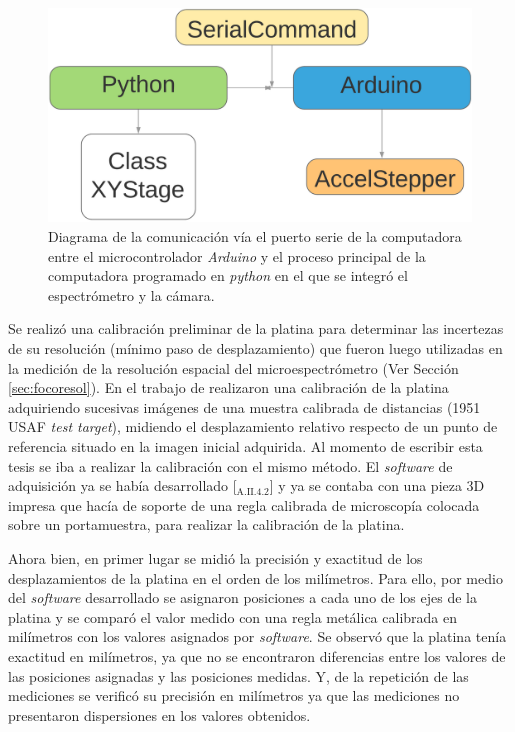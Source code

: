 \begin{figure}[H]
	\centering
	\includegraphics[scale=0.5]{Figs/microespectrometro/diagflujoplatina.png}
	\caption{Diagrama de la comunicación vía el puerto serie de la computadora entre el microcontrolador \textit{Arduino} y el proceso principal de la computadora programado en \textit{python} en el que se integró el espectrómetro y la cámara.}
	\label{fig:cnpl}
\end{figure}

Se realizó una calibración preliminar de la platina para determinar las incertezas de su resolución (mínimo paso de desplazamiento) que fueron luego utilizadas en la medición de la resolución espacial del microespectrómetro (Ver Sección \ref{sec:focoresol}). En el trabajo de \cite{schaa} realizaron una calibración de la platina adquiriendo sucesivas imágenes de una muestra calibrada de distancias (1951 USAF \textit{test target}), midiendo el desplazamiento relativo respecto de un punto de referencia situado en la imagen inicial adquirida. Al momento de escribir esta tesis se iba a realizar la calibración con el mismo método. El \textit{software} de adquisición ya se había desarrollado [\href{https://github.com/jrr1984/defectsGUI/blob/master/views.py}{\faGithub$_{\text{A.II}.4.2}$}] y ya se contaba con una pieza 3D impresa que hacía de soporte de una regla calibrada de microscopía colocada sobre un portamuestra, para realizar la calibración de la platina.

Ahora bien, en primer lugar se midió la precisión y exactitud de los desplazamientos de la platina en el orden de los milímetros. Para ello, por medio del \textit{software} desarrollado se asignaron posiciones a cada uno de los ejes de la platina y se comparó el valor medido con una regla metálica calibrada en milímetros con los valores asignados por \textit{software}. Se observó que la platina tenía exactitud en milímetros, ya que no se encontraron diferencias entre los valores de las posiciones asignadas y las posiciones medidas. Y, de la repetición de las mediciones se verificó su precisión en milímetros ya que las mediciones no presentaron dispersiones en los valores obtenidos.

